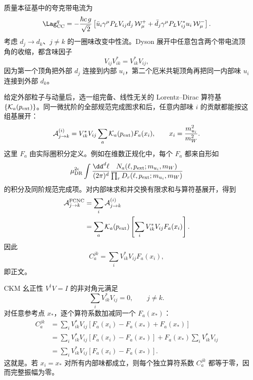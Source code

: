 \begin{derivation}
质量本征基中的夸克带电流为
\begin{equation*}
 \Lag_{\rm CC}^{q}
 =-\frac{\hbar c\,g}{\sqrt2}
 \left[
 \bar u_i\gamma^\mu P_LV_{ij}d_j\,\mathcal W_\mu^+
 +\bar d_j\gamma^\mu P_LV_{ij}^*u_i\,\mathcal W_\mu^-
 \right].
\end{equation*}
考虑 $d_j\to d_k$、$j\neq k$ 的一圈味改变中性流。Dyson 展开中任意包含两个带电流顶角的收缩，都含味因子
\begin{equation*}
 V_{ij}V_{ik}^*=V_{ik}^*V_{ij},
\end{equation*}
因为第一个顶角把外部 $d_j$ 连接到内部 $u_i$，第二个厄米共轭顶角再把同一内部味 $u_i$ 连接到外部 $d_k$。

给定外部粒子与动量后，选一组完备、线性无关的 Lorentz--Dirac 算符基 $\{\mathcal K_a(p_{\rm ext})\}$。同一微扰阶的全部规范完成图求和后，任意内部味 $i$ 的贡献都能按这组基展开：
\begin{equation*}
 \mathcal A_{j\to k}^{(i)}
 =V_{ik}^*V_{ij}
 \sum_a\mathcal K_a(p_{\rm ext})F_a(x_i),
 \qquad
 x_i=\frac{m_{u_i}^2}{m_W^2}.
\end{equation*}
这里 $F_a$ 由实际圈积分定义。例如在维数正规化中，每个 $F_a$ 都来自形如
\begin{equation*}
 \mu_{\rm DR}^{2\epsilon}
 \int\frac{\dd^d\ell}{(2\pi)^d}
 \frac{N_a(\ell,p_{\rm ext};m_{u_i},m_W)}
 {\prod_r D_r(\ell,p_{\rm ext};m_{u_i},m_W)}
\end{equation*}
的积分及同阶规范完成项。对内部味求和并交换有限求和与算符基展开，得到
\begin{align*}
 \mathcal A_{j\to k}^{\rm FCNC}
 &=\sum_i\mathcal A_{j\to k}^{(i)}\\
 &=\sum_a\mathcal K_a(p_{\rm ext})
 \left[\sum_iV_{ik}^*V_{ij}F_a(x_i)\right].
\end{align*}
因此
\begin{equation*}
 C_a^{jk}=\sum_iV_{ik}^*V_{ij}F_a(x_i),
\end{equation*}
即正文。

CKM 幺正性 $V^\dagger V=I$ 的非对角元满足
\begin{equation*}
 \sum_iV_{ik}^*V_{ij}=0,
 \qquad j\neq k.
\end{equation*}
对任意参考点 $x_*$，逐个算符系数加减同一个 $F_a(x_*)$：
\begin{align*}
 C_a^{jk}
 &=\sum_iV_{ik}^*V_{ij}
 \left[F_a(x_i)-F_a(x_*)+F_a(x_*)\right]\\
 &=\sum_iV_{ik}^*V_{ij}[F_a(x_i)-F_a(x_*)]
 +F_a(x_*)\sum_iV_{ik}^*V_{ij}\\
 &=\sum_iV_{ik}^*V_{ij}[F_a(x_i)-F_a(x_*)].
\end{align*}
这就是。若 $x_i=x_*$ 对所有内部味都成立，则每个独立算符系数 $C_a^{jk}$ 都等于零，因而完整振幅为零。


\end{derivation}
